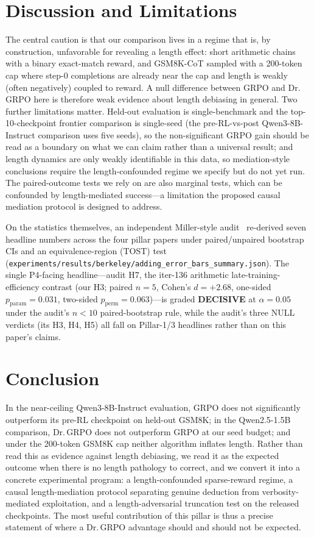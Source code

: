 \section{Discussion and Limitations}
\label{sec:p4-discussion}
The central caution is that our comparison lives in a regime that is, by
construction, unfavorable for revealing a length effect: short arithmetic chains
with a binary exact-match reward, and GSM8K-CoT sampled with a 200-token cap where
step-0 completions are already near the cap and length is weakly (often
negatively) coupled to reward. A null difference between GRPO and
Dr.\,GRPO here is therefore weak evidence about length debiasing in general. Two
further limitations matter. Held-out evaluation is single-benchmark and
the top-10-checkpoint frontier comparison is single-seed (the pre-RL-vs-post
Qwen3-8B-Instruct comparison uses five seeds), so the non-significant GRPO gain
should be read as a boundary on what we can claim rather than a universal result;
and length
dynamics are only weakly identifiable in this data, so mediation-style conclusions
require the length-confounded regime we specify but do not yet run. The
paired-outcome tests we rely on are also marginal tests, which can be confounded by
length-mediated success---a limitation the proposed causal mediation protocol is
designed to address.

On the statistics themselves, an independent Miller-style
audit~\citep{miller2024erroreval} re-derived seven headline numbers across the four
pillar papers under paired/unpaired bootstrap CIs and an equivalence-region (TOST)
test (\texttt{experiments/results/berkeley/adding\_error\_bars\_summary.json}).
The single P4-facing headline---audit H7, the iter-136 arithmetic late-training-efficiency
contrast (our H3; paired $n{=}5$, Cohen's $d = +2.68$,
one-sided $p_{\mathrm{param}} = 0.031$, two-sided $p_{\mathrm{perm}} = 0.063$)---is
graded \textbf{DECISIVE} at $\alpha = 0.05$ under the audit's $n{<}10$
paired-bootstrap rule, while the audit's three NULL verdicts (its H3, H4, H5) all
fall on Pillar-1/3 headlines rather than on this paper's claims.

\section{Conclusion}
\label{sec:p4-conclusion}
In the near-ceiling Qwen3-8B-Instruct evaluation, GRPO does not significantly
outperform its pre-RL checkpoint on held-out GSM8K; in the Qwen2.5-1.5B
comparison, Dr.\,GRPO does not outperform GRPO at our seed budget; and under the
200-token GSM8K cap neither algorithm inflates length. Rather than read this as
evidence against length debiasing, we
read it as the expected outcome when there is no length pathology to correct, and
we convert it into a concrete experimental program: a length-confounded sparse-reward
regime, a causal length-mediation protocol separating genuine deduction from
verbosity-mediated exploitation, and a length-adversarial truncation test on the
released checkpoints. The most useful contribution of this pillar is thus a precise
statement of where a Dr.\,GRPO advantage should and should not be expected.
